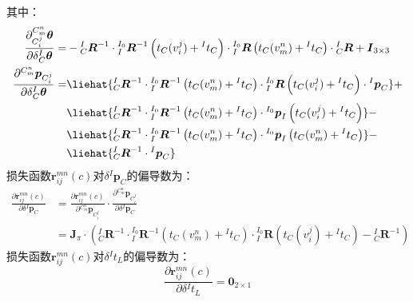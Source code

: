 其中：
\begin{equation}
  \begin{aligned}
    \frac{\partial ^{C_m^n}_{C_i^j}\boldsymbol{\theta}}{\partial \delta {^{I}_{C}\boldsymbol{\theta}}}= &
    -{^{I}_{C}\boldsymbol{R}^{-1}}
    \cdot{{^{I_0}_{I}}\boldsymbol{R}^{-1}\left( t_{C}(v_i^j)+{^{I}t_C}\right) }
    \cdot{{^{I_0}_{I}}\boldsymbol{R}\left( t_{C}(v_m^n)+{^{I}t_C}\right) }
    \cdot{{^{I}_{C}}\boldsymbol{R}}+\boldsymbol{I}_{3\times 3}
    \\
    \frac{\partial {^{C_m^n}\boldsymbol{p}_{C_i^j}}}{\partial \delta {^{I}_{C}\boldsymbol{\theta}}}=    &
    \liehat{{{^{I}_{C}}\boldsymbol{R}^{-1}}\cdot{{^{I_0}_{I}}\boldsymbol{R}^{-1}\left( t_{C}(v_m^n)+{^{I}t_C}\right) }\cdot{{^{I_0}_{I}}\boldsymbol{R}\left( t_{C}(v_i^j)+{^{I}t_C}\right) }
    \cdot{^{I}\boldsymbol{p}_C}}
    +\\&\liehat{{{^{I}_{C}}\boldsymbol{R}^{-1}}\cdot{{^{I_0}_{I}}\boldsymbol{R}^{-1}\left( t_{C}(v_m^n)+{^{I}t_C}\right) }
    \cdot{^{I_0}\boldsymbol{p}_I\left( t_{C}(v_i^j)+{^{I}t_C}\right)}}
    -\\&\liehat{{{^{I}_{C}}\boldsymbol{R}^{-1}}
    \cdot{{^{I_0}_{I}}\boldsymbol{R}^{-1}\left( t_{C}(v_m^n)+{^{I}t_C}\right) }\cdot{^{I_0}\boldsymbol{p}_I\left( t_{C}(v_m^n)+{^{I}t_C}\right)}}
    -\\&\liehat{{{^{I}_{C}}\boldsymbol{R}^{-1}}\cdot{^{I}\boldsymbol{p}_C}}
  \end{aligned}
\end{equation}
损失函数$\boldsymbol{r}_{ij}^{mn}(c)$对$\delta{^{I}\boldsymbol{p}_C}$的偏导数为：
\begin{equation}
  \label{equ:jacobian_pci}
  \begin{aligned}
    \frac{\partial \boldsymbol{r}_{ij}^{mn}(c)}{\partial \delta {^{I}\boldsymbol{p}_C}} & =
    \frac{\partial \boldsymbol{r}_{ij}^{mn}(c)}{\partial {^{C_m^n}\boldsymbol{p}_{C_i^j}}}\cdot
    \frac{\partial {^{C_m^n}\boldsymbol{p}_{C_i^j}}}{\partial \delta {^{I}\boldsymbol{p}_C}} \\&=
    \boldsymbol{J}_{\pi}\cdot
    \left(
    {{^{I}_{C}}\boldsymbol{R}^{-1}}\cdot{{^{I_0}_{I}}\boldsymbol{R}^{-1}\left( t_{C}(v_m^n)+{^{I}t_C}\right) }\cdot{{^{I_0}_{I}}\boldsymbol{R}\left( t_{C}(v_i^j)+{^{I}t_C}\right) }
    -{{^{I}_{C}}\boldsymbol{R}^{-1}}
    \right)
  \end{aligned}
\end{equation}
损失函数$\boldsymbol{r}_{ij}^{mn}(c)$对$\delta{^{I}t_{L}}$的偏导数为：
\begin{equation}
  \frac{\partial \boldsymbol{r}_{ij}^{mn}(c)}{\partial \delta {^{I}t_{L}}}=\boldsymbol{0}_{2\times 1}
\end{equation}
